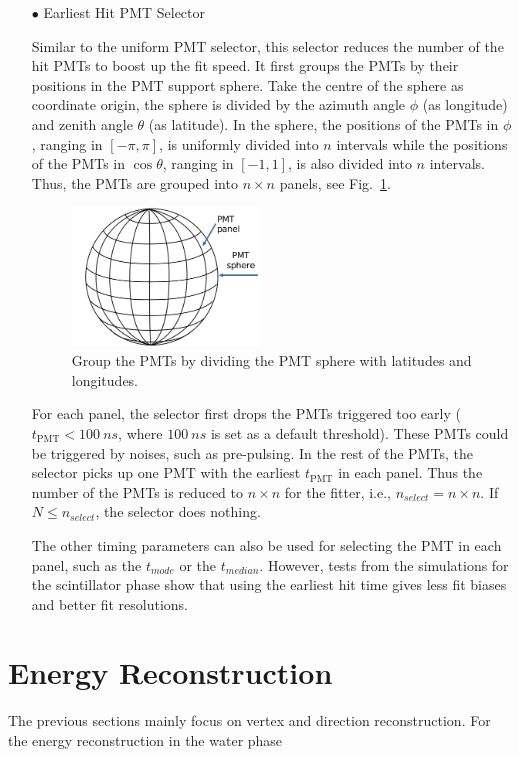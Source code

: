 \begin{itemize}
	\item[$\bullet$] Earliest Hit PMT Selector
	
	Similar to the uniform PMT selector, this selector reduces the number of the hit PMTs to boost up the fit speed. It first groups the PMTs by their positions in the PMT support sphere. Take the centre of the sphere as coordinate origin, the sphere is divided by the azimuth angle $\phi$ (as longitude) and zenith angle $\theta$ (as latitude). In the sphere, the positions of the PMTs in $\phi$, ranging in $[-\pi,\pi]$, is uniformly divided into $n$ intervals while the positions of the PMTs in $\cos\theta$, ranging in $[-1, 1]$, is also divided into $n$ intervals. Thus, the PMTs are grouped into $n\times n$ panels, see Fig.~\ref{GroupPMTs}. 
	\begin{figure}[!htb]
		\centering
		\includegraphics[width=5cm]{GroupPMTs.png}
		\caption{Group the PMTs by dividing the PMT sphere with latitudes and longitudes.}
		\label{GroupPMTs}
	\end{figure}
	
	For each panel, the selector first drops the PMTs triggered too early ($t_\mathrm{PMT}<100~ns$, where $100~ns$ is set as a default threshold). These PMTs could be triggered by noises, such as pre-pulsing. In the rest of the PMTs, the selector picks up one PMT with the earliest $t_\mathrm{PMT}$ in each panel. Thus the number of the PMTs is reduced to $n\times n$ for the fitter, i.e., $n_{select}=n\times n$. If $N\leq n_{select}$, the selector does nothing. 
	
	The other timing parameters can also be used for selecting the PMT in each panel, such as the $t_{mode}$ or the $t_{median}$. However, tests from the simulations for the scintillator phase show that using the earliest hit time gives less fit biases and better fit resolutions.
\end{itemize}

\section{Energy Reconstruction}
 
The previous sections mainly focus on vertex and direction reconstruction. For the energy reconstruction in the water phase 

